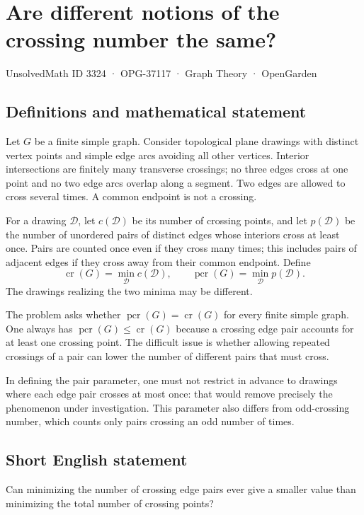 \documentclass[11pt,a4paper]{article}
\begin{document}
\section*{Are different notions of the crossing number the same?}\label{3324}
{\small UnsolvedMath ID 3324 · OPG-37117 · Graph Theory · OpenGarden}
\subsection{Definitions and mathematical statement}
Let $G$ be a finite simple graph. Consider topological plane drawings
with distinct vertex points and simple edge arcs avoiding all other
vertices. Interior intersections are finitely many transverse
crossings; no three edges cross at one point and no two edge arcs
overlap along a segment. Two edges are allowed to cross several
times. A common endpoint is not a crossing.

For a drawing $\mathcal D$, let $c(\mathcal D)$ be its number of
crossing points, and let $p(\mathcal D)$ be the number of unordered
pairs of distinct edges whose interiors cross at least once. Pairs
are counted once even if they cross many times; this includes pairs
of adjacent edges if they cross away from their common endpoint.
Define
\[
 \operatorname{cr}(G)=\min_{\mathcal D}c(\mathcal D),
 \qquad
 \operatorname{pcr}(G)=\min_{\mathcal D}p(\mathcal D).
\]
The drawings realizing the two minima may be different.

The problem asks whether $\operatorname{pcr}(G)=\operatorname{cr}(G)$
for every finite simple graph. One always has
$\operatorname{pcr}(G)\le\operatorname{cr}(G)$ because a crossing edge
pair accounts for at least one crossing point. The difficult issue
is whether allowing repeated crossings of a pair can lower the
number of different pairs that must cross.

In defining the pair parameter, one must not restrict in advance
to drawings where each edge pair crosses at most once: that would
remove precisely the phenomenon under investigation. This parameter
also differs from odd-crossing number, which counts only pairs
crossing an odd number of times.
\subsection{Short English statement}
Can minimizing the number of crossing edge pairs ever give a smaller value than minimizing the total number of crossing points?
\end{document}
